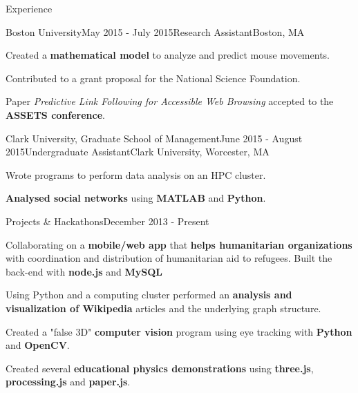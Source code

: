 \documentclass{resume} %
\begin{document}
\begin{rSection}{Experience}

\begin{rSubsection}{Boston University}{May 2015 - July 2015}{Research Assistant}{Boston, MA}
\item Created a \textcolor{mygray}{\textbf{mathematical model}} to analyze and predict mouse movements.
\item Contributed to a grant proposal for the National Science Foundation.
\item Paper \emph{Predictive Link Following for Accessible Web Browsing} accepted to the \textcolor{mygray}{\textbf{ASSETS conference}}.
\end{rSubsection}


\begin{rSubsection}{Clark University, Graduate School of Management}{June 2015 - August 2015}{Undergraduate Assistant}{Clark University, Worcester, MA}
\item Wrote programs to perform data analysis on an HPC cluster.
\item \textcolor{mygray}{\textbf{Analysed social networks}} using \textcolor{mygray}{\textbf{MATLAB}} and \textcolor{mygray}{\textbf{Python}}.
\end{rSubsection}


\begin{rSubsection}{Projects \& Hackathons}{December 2013 - Present}{}{}
\item Collaborating on a \textcolor{mygray}{\textbf{mobile/web app}} that \textcolor{mygray}{\textbf{helps humanitarian organizations}} with coordination and distribution of humanitarian aid to refugees. Built the back-end with \textcolor{mygray}{\textbf{node.js}} and \textcolor{mygray}{\textbf{MySQL}}
\item Using Python and a computing cluster performed an \textcolor{mygray}{\textbf{analysis and visualization of Wikipedia}} articles and the underlying graph structure.
\item Created a "false 3D" \textcolor{mygray}{\textbf{computer vision}} program using eye tracking with \textcolor{mygray}{\textbf{Python}} and \textcolor{mygray}{\textbf{OpenCV}}.
\item Created several \textcolor{mygray}{\textbf{educational physics demonstrations}} using \textcolor{mygray}{\textbf{three.js}}, \textcolor{mygray}{\textbf{processing.js}} and \textcolor{mygray}{\textbf{paper.js}}.
\end{rSubsection}


\end{rSection}
\end{document}
